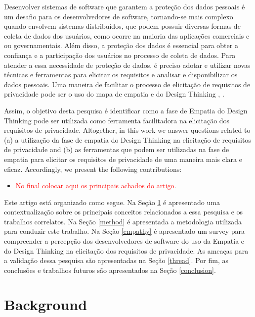 \documentclass[conference]{IEEEtran}
\begin{document}
Desenvolver sistemas de software que garantem a proteção dos dados pessoais é um desafio para os desenvolvedores de software, tornando-se mais complexo quando envolvem sistemas distribuídos, que podem possuir diversas formas de coleta de dados dos usuários, como ocorre na maioria das aplicações comerciais e ou governamentais. Além disso, a proteção dos dados é essencial para obter a confiança e a participação dos usuários no processo de coleta de dados. Para atender a essa necessidade de proteção de dados, é preciso adotar e utilizar novas técnicas e ferramentas para elicitar os requisitos e analisar e disponibilizar os dados pessoais. Uma maneira de facilitar o processo de elicitação de requisitos de privacidade pode ser o uso do mapa de empatia \cite{DBLP:conf/sbes/FerreiraCB15} e do Design Thinking \cite{DBLP:books/lib/brown2009change}, \cite{DBLP:conf/hci/CanedoC18}. 

Assim, o objetivo desta pesquisa é identificar como a fase de Empatia do Design Thinking pode ser utilizada como ferramenta facilitadora na elicitação dos requisitos de privacidade. Altogether, in this work we answer questions related to (a) a utilização da fase de empatia do Design Thinking na elicitação de requisitos de privacidade and (b) as ferramentas que podem ser utilizadas na fase de empatia para elicitar os requisitos de privacidade de uma maneira mais clara e eficaz. Accordingly, we present the following contributions:

\begin{itemize}
    \item \textcolor{red}{No final colocar aqui os principais achados do artigo}.
\end{itemize}

Este artigo está organizado como segue. Na Seção \ref{back} é apresentado uma contextualização sobre os principais conceitos relacionados a essa pesquisa e os trabalhos correlatos. Na Seção \ref{method} é apresentada a metodologia utilizada para conduzir este trabalho. Na Seção \ref{empathy} é apresentado um survey para compreender a percepção dos desenvolvedores de software do uso da Empatia e do Design Thinking na elicitação dos requisitos de privacidade. As ameaças para a validação dessa pesquisa são apresentadas na Seção \ref{thread}. Por fim, as conclusões e trabalhos futuros são apresentados na Seção \ref{conclusion}.

\section{Background}
\label{back}
\end{document}
